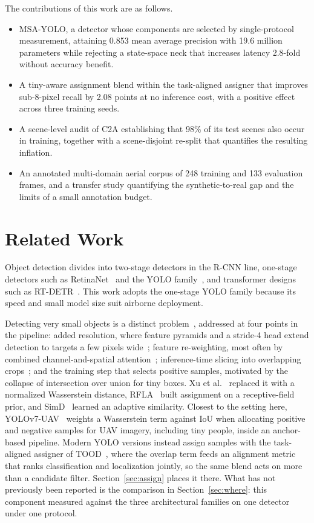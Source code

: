 \documentclass[conference,a4paper]{IEEEtran}
\begin{document}
The contributions of this work are as follows.
\begin{itemize}
\item MSA-YOLO, a detector whose components are selected by single-protocol
measurement, attaining 0.853 mean average precision with 19.6 million parameters
while rejecting a state-space neck that increases latency 2.8-fold without
accuracy benefit.
\item A tiny-aware assignment blend within the task-aligned assigner that
improves sub-8-pixel recall by 2.08 points at no inference cost, with a positive
effect across three training seeds.
\item A scene-level audit of C2A establishing that 98\% of its test scenes also
occur in training, together with a scene-disjoint re-split that quantifies the
resulting inflation.
\item An annotated multi-domain aerial corpus of 248 training and 133 evaluation
frames, and a transfer study quantifying the synthetic-to-real gap and the limits
of a small annotation budget.
\end{itemize}

\section{Related Work}
\label{sec:rw}
Object detection divides into two-stage detectors in the R-CNN line, one-stage
detectors such as RetinaNet~\cite{lin2017focal} and the YOLO
family~\cite{wang2024yolov9,jocher2024yolo11}, and transformer designs such as
RT-DETR~\cite{zhao2024rtdetr}. This work adopts the one-stage YOLO family because
its speed and small model size suit airborne deployment.

Detecting very small objects is a distinct problem~\cite{cheng2023smallobject},
addressed at four points in the pipeline: added resolution, where feature
pyramids and a stride-4 head extend detection to targets a few pixels
wide~\cite{zhu2021tphyolov5}; feature re-weighting, most often by combined
channel-and-spatial attention~\cite{woo2018cbam}; inference-time slicing into
overlapping crops~\cite{akyon2022sahi}; and the training step that selects
positive samples, motivated by the collapse of intersection over union for tiny
boxes. Xu et al.~\cite{xu2022nwdrka} replaced it with a normalized Wasserstein
distance, RFLA~\cite{xu2022rfla} built assignment on a receptive-field prior,
and SimD~\cite{shi2024simd} learned an adaptive similarity. Closest to the setting here, YOLOv7-UAV~\cite{zeng2023yolov7uav}
weights a Wasserstein term against IoU when allocating positive and negative
samples for UAV imagery, including tiny people, inside an anchor-based
pipeline. Modern YOLO versions instead assign samples with the task-aligned
assigner of TOOD~\cite{feng2021tood}, where the overlap term feeds an alignment
metric that ranks classification and localization jointly, so the same blend
acts on more than a candidate filter. Section~\ref{sec:assign} places it there.
What has not previously been reported is the comparison in
Section~\ref{sec:where}: this component measured against the three architectural
families on one detector under one protocol.
\end{document}
